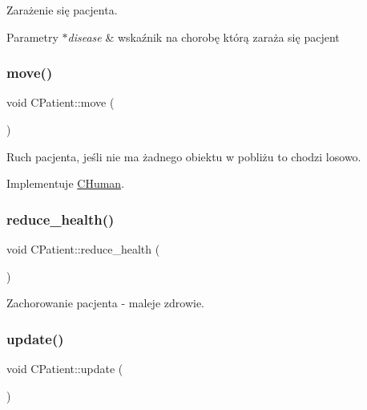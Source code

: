 Zarażenie się pacjenta. 


\begin{DoxyParams}{Parametry}
{\em $\ast$disease} & wskaźnik na chorobę którą zaraża się pacjent \\
\hline
\end{DoxyParams}
\mbox{\label{class_c_patient_ae0af7da80587d2725acbb31923a41cd0}} 
\subsubsection{\texorpdfstring{move()}{move()}}
{\footnotesize\ttfamily void C\+Patient\+::move (\begin{DoxyParamCaption}{ }\end{DoxyParamCaption})\hspace{0.3cm}{\ttfamily [virtual]}}



Ruch pacjenta, jeśli nie ma żadnego obiektu w pobliżu to chodzi losowo. 



Implementuje \mbox{\hyperlink{class_c_human_af0a61dfcb43e2d094ab66b29735c4424}{C\+Human}}.

\mbox{\label{class_c_patient_a167c8f49c789e29394ef70964d25d118}} 
\subsubsection{\texorpdfstring{reduce\+\_\+health()}{reduce\_health()}}
{\footnotesize\ttfamily void C\+Patient\+::reduce\+\_\+health (\begin{DoxyParamCaption}{ }\end{DoxyParamCaption})}



Zachorowanie pacjenta -\/ maleje zdrowie. 

\mbox{\label{class_c_patient_a40dd4c549f4b40928b95dd4d8f2ad311}} 
\subsubsection{\texorpdfstring{update()}{update()}}
{\footnotesize\ttfamily void C\+Patient\+::update (\begin{DoxyParamCaption}{ }\end{DoxyParamCaption})\hspace{0.3cm}{\ttfamily [virtual]}}




